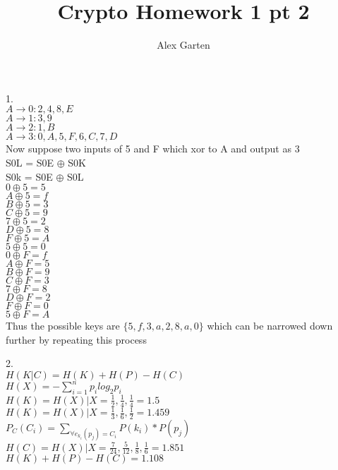 \documentclass{article}
\begin{document}
\title{Crypto Homework 1 pt 2}
\author{Alex Garten}
\date{}

1.\\
$A \rightarrow 0: 2, 4, 8, E$ \\
$A \rightarrow 1: 3, 9$ \\
$A \rightarrow 2: 1, B$ \\
$A \rightarrow 3: 0, A, 5, F, 6, C, 7, D$ \\
Now suppose two inputs of 5 and F which xor to A and output as 3 \\
S0L = S0E $\oplus$ S0K \\
S0k = S0E $\oplus$ S0L \\
$0 \oplus 5 = 5$ \\
$A \oplus 5 = f$ \\
$B \oplus 5 = 3$ \\
$C \oplus 5 = 9$ \\
$7 \oplus 5 = 2$ \\
$D \oplus 5 = 8$ \\
$F \oplus 5 = A$ \\
$5 \oplus 5 = 0$ \\
$0 \oplus F = f$ \\
$A \oplus F = 5$ \\
$B \oplus F = 9$ \\
$C \oplus F = 3$ \\
$7 \oplus F = 8$ \\
$D \oplus F = 2$ \\
$F \oplus F = 0$ \\
$5 \oplus F = A$ \\
Thus the possible keys are $\{5, f, 3, a, 2, 8, a, 0\}$ which can be narrowed down further by repeating this process


2.\\
$H(K|C) = H(K) + H(P) - H(C)$ \\
$H(X) = - \sum\limits_{i=1}^{n}p_ilog_2p_i$ \\
$H(K) = H(X) | X = \frac{1}{2}, \frac{1}{4}, \frac{1}{4} = 1.5$ \\
$H(K) = H(X) | X = \frac{1}{3}, \frac{1}{6}, \frac{1}{2} = 1.459$ \\
$P_C(C_i) = \sum\limits_{\forall e_{k_i}(p_j) = C_i}P(k_i)*P(p_j)$ \\
$H(C) = H(X) | X = \frac{7}{24}, \frac{5}{12}, \frac{1}{8}, \frac{1}{6} = 1.851$ \\
$H(K) + H(P) - H(C) = 1.108$
\end{document}
